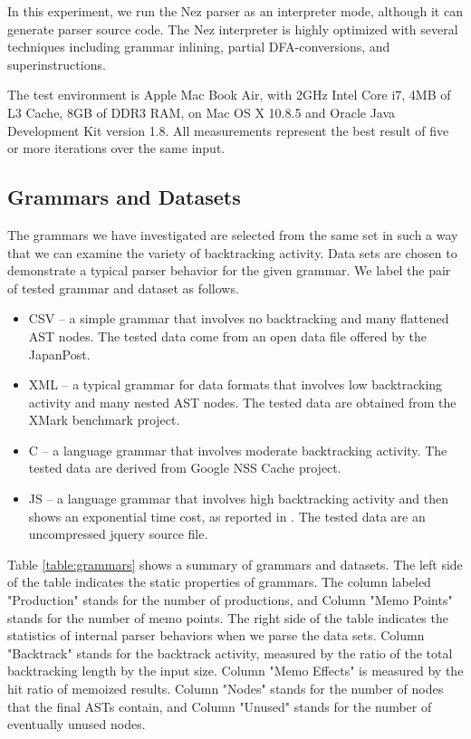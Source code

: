 \documentclass[JIP]{ipsj}
\begin{document}
In this experiment, we run the Nez parser as an interpreter mode, although it can generate parser source code. The Nez interpreter is highly optimized with several techniques including grammar inlining, partial DFA-conversions, and superinstructions. 

The test environment is Apple Mac Book Air, with 2GHz Intel Core i7, 4MB of L3 Cache, 8GB of DDR3 RAM, on Mac OS X 10.8.5 and Oracle Java Development Kit version 1.8. All measurements represent the best result of five or more iterations over the same input.

\subsection{Grammars and Datasets}

The grammars we have investigated are selected from the same set \cite{PRO101} in such a way that we can examine the variety of backtracking activity. Data sets are chosen to demonstrate a typical parser behavior for the given grammar. We label the pair of tested grammar and dataset as follows.

\begin{itemize}
\item CSV -- a simple grammar that involves no backtracking and many flattened AST nodes. The tested data come from an open data file offered by the JapanPost.  
\item XML -- a typical grammar for data formats that involves low backtracking activity and many nested AST nodes. The tested data are obtained from the XMark benchmark project\cite{VLDB02_XMark}. 
\item C -- a language grammar that involves moderate backtracking activity. The tested data are derived from Google NSS Cache project. 
\item JS -- a language grammar that involves high backtracking activity and then shows an exponential time cost, as reported in \cite{PRO101}. The tested data are an uncompressed jquery source file.  
\end{itemize}

Table \ref{table:grammars} shows a summary of grammars and datasets. The left side of the table indicates the static properties of grammars. The column labeled "Production" stands for the number of productions, and Column "Memo Points" stands for the number of memo points. The right side of the table indicates the statistics of internal parser behaviors when we parse the data sets. Column "Backtrack" stands for the backtrack activity, measured by the ratio of the total backtracking length by the input size. Column "Memo Effects" is measured by the hit ratio of memoized results. Column "Nodes" stands for the number of nodes that the final ASTs contain, and Column "Unused" stands for the number of eventually unused nodes.
\end{document}
